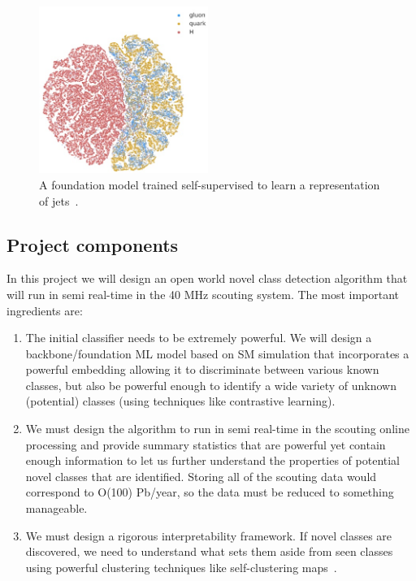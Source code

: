 \documentclass[12pt]{iopart}
\begin{document}
\begin{figure}[ht]
    \centering
    \includegraphics[width=0.49\textwidth]{figures/foundation_cl.jpg}
    \caption{A foundation model trained self-supervised to learn a representation of jets~\cite{foundation}.}
    \label{fig:jet}
\end{figure}



\subsection{Project components}

In this project we will design an open world novel class detection algorithm that will run in semi real-time in the 40 MHz scouting system. The most important ingredients are:
\begin{enumerate}
    \item The initial classifier needs to be extremely powerful. We will design a backbone/foundation ML model based on SM simulation that incorporates a powerful embedding allowing it to discriminate between various known classes, but also be powerful enough to identify a wide variety of unknown (potential) classes (using techniques like contrastive learning).
    \item We must design the algorithm to run in semi real-time in the scouting online processing and provide summary statistics that are powerful yet contain enough information to let us further understand the properties of potential novel classes that are identified. Storing all of the scouting data would correspond to O(100) Pb/year, so the data must be reduced to something manageable. 
    \item We must design a rigorous interpretability framework. If novel classes are discovered, we need to understand what sets them aside from seen classes using powerful clustering techniques like self-clustering maps~\cite{6790553}.
\end{enumerate}
\end{document}
